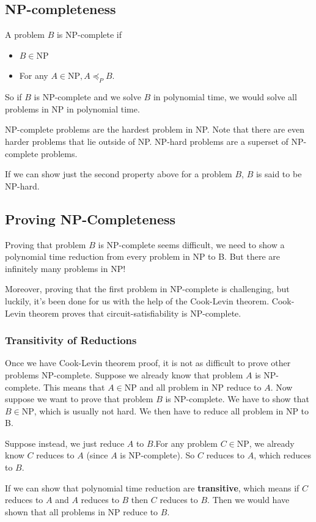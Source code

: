 \subsection{NP-completeness}
A problem $B$ is NP-complete if 
\begin{itemize}
	\item $B \in \text{NP}$
	\item For any $A \in \text{NP}, A \preccurlyeq_P B$.  
\end{itemize}

So if $B$ is NP-complete and we solve $B$ in polynomial time, we would solve all problems in NP in polynomial time.

NP-complete problems are the hardest problem in NP. Note that there are even harder problems that lie outside of NP. NP-hard problems are a superset of NP-complete problems.

If we can show just the second property above for a problem $B$, $B$ is said to be NP-hard.

\subsection{Proving NP-Completeness}
Proving that problem $B$ is NP-complete seems difficult, we need to show a polynomial time reduction from every problem in NP to B. But there are infinitely many problems in NP!

Moreover, proving that the first problem in NP-complete is challenging, but luckily, it's been done for us with the help of the Cook-Levin theorem. Cook-Levin theorem proves that circuit-satisfiability is NP-complete.

\subsubsection{Transitivity of Reductions}
Once we have Cook-Levin theorem proof, it is not as difficult to prove other problems NP-complete. Suppose we already know that problem $A$ is NP-complete. This means that $A \in \text{NP}$ and all problem in NP reduce to $A$. Now suppose we want to prove that problem $B$ is NP-complete. We have to show that $B \in \text{NP}$, which is usually not hard. We then have to reduce all problem in NP to B.

Suppose instead, we just reduce $A$ to $B$.For any problem $C \in \text{NP}$, we already know $C$ reduces to $A$ (since $A$ is NP-complete). So $C$ reduces to $A$, which reduces to $B$.

If we can show that polynomial time reduction are \textbf{transitive}, which means if $C$ reduces to $A$ and $A$ reduces to $B$ then $C$ reduces to $B$. Then we would have shown that all problems in NP reduce to $B$.

